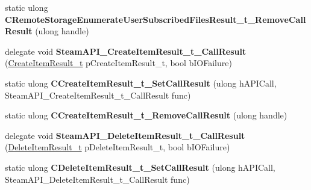 \begin{DoxyCompactItemize}
\item 
\mbox{\label{class_valve_1_1_interop_1_1_native_entrypoints_a18b1f5fa078f8cc5036449c746db961c}} 
static ulong {\bfseries C\+Remote\+Storage\+Enumerate\+User\+Subscribed\+Files\+Result\+\_\+t\+\_\+\+Remove\+Call\+Result} (ulong handle)
\item 
\mbox{\label{class_valve_1_1_interop_1_1_native_entrypoints_a29465552681dc2712d8b941e1fb4166a}} 
delegate void {\bfseries Steam\+A\+P\+I\+\_\+\+Create\+Item\+Result\+\_\+t\+\_\+\+Call\+Result} (\hyperlink{struct_valve_1_1_steamworks_1_1_create_item_result__t}{Create\+Item\+Result\+\_\+t} p\+Create\+Item\+Result\+\_\+t, bool b\+I\+O\+Failure)
\item 
\mbox{\label{class_valve_1_1_interop_1_1_native_entrypoints_aea53df6cd32b0c48b944d4b6e6639013}} 
static ulong {\bfseries C\+Create\+Item\+Result\+\_\+t\+\_\+\+Set\+Call\+Result} (ulong h\+A\+P\+I\+Call, Steam\+A\+P\+I\+\_\+\+Create\+Item\+Result\+\_\+t\+\_\+\+Call\+Result func)
\item 
\mbox{\label{class_valve_1_1_interop_1_1_native_entrypoints_a370dd27c15113a4989dccabda8cc5bd7}} 
static ulong {\bfseries C\+Create\+Item\+Result\+\_\+t\+\_\+\+Remove\+Call\+Result} (ulong handle)
\item 
\mbox{\label{class_valve_1_1_interop_1_1_native_entrypoints_a98bf09f1feae00268c4b9c01504af34f}} 
delegate void {\bfseries Steam\+A\+P\+I\+\_\+\+Delete\+Item\+Result\+\_\+t\+\_\+\+Call\+Result} (\hyperlink{struct_valve_1_1_steamworks_1_1_delete_item_result__t}{Delete\+Item\+Result\+\_\+t} p\+Delete\+Item\+Result\+\_\+t, bool b\+I\+O\+Failure)
\item 
\mbox{\label{class_valve_1_1_interop_1_1_native_entrypoints_a48120a2d6caf3bd9a9ac888c8bf0e07a}} 
static ulong {\bfseries C\+Delete\+Item\+Result\+\_\+t\+\_\+\+Set\+Call\+Result} (ulong h\+A\+P\+I\+Call, Steam\+A\+P\+I\+\_\+\+Delete\+Item\+Result\+\_\+t\+\_\+\+Call\+Result func)
\item 
\mbox{\label{class_valve_1_1_interop_1_1_native_entrypoints_a7ffb1a3331f3f2fcadd7e213f5f4da90}} 

\end{DoxyCompactItemize}
